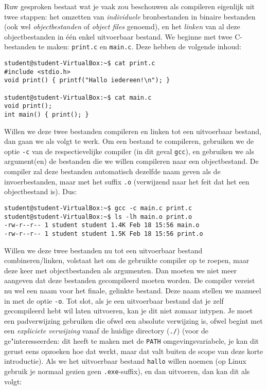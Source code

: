 \documentclass[a4paper,twoside,openany]{memoir}
\begin{document}
Ruw gesproken bestaat wat je vaak zou beschouwen als compileren eigenlijk
uit twee stappen: het omzetten van \emph{individuele} bronbestanden
in binaire bestanden (ook wel \emph{objectbestanden} of \emph{object files}
genoemd), en het \emph{linken} van al deze objectbestanden in één enkel
uitvoerbaar bestand. We beginne met twee C-bestanden te maken: \verb!print.c! en
\verb!main.c!. Deze hebben de volgende inhoud:

\begin{verbatim}
student@student-VirtualBox:~$ cat print.c
#include <stdio.h>
void print() { printf("Hallo iedereen!\n"); }

student@student-VirtualBox:~$ cat main.c
void print();
int main() { print(); }
\end{verbatim}

Willen we deze twee bestanden compileren en linken tot een uitvoerbaar bestand,
dan gaan we als volgt te werk. Om een bestand te compileren, gebruiken we de
optie \verb!-c! van de respectievelijke compiler (in dit geval \verb!gcc!), en
gebruiken we als argument(en) de bestanden die we willen compileren naar een
objectbestand. De compiler zal deze bestanden automatisch dezelfde naam geven
als de invoerbestanden, maar met het suffix \verb!.o! (verwijzend naar het feit
dat het een objectbestand is). Dus:

\begin{verbatim}
student@student-VirtualBox:~$ gcc -c main.c print.c 
student@student-VirtualBox:~$ ls -lh main.o print.o 
-rw-r--r-- 1 student student 1.4K Feb 18 15:56 main.o
-rw-r--r-- 1 student student 1.5K Feb 18 15:56 print.o
\end{verbatim}

Willen we deze twee bestanden nu tot een uitvoerbaar bestand combineren/linken,
volstaat het om de gebruikte compiler op te roepen, maar deze keer met
objectbestanden als argumenten. Dan moeten we niet meer aangeven dat deze
bestanden gecompileerd moeten worden. De compiler vereist nu wel een naam voor
het finale, gelinkte bestand. Deze naam stellen we manueel in met de optie
\verb!-o!. Tot slot, als je een uitvoerbaar bestand dat je zelf gecompileerd
hebt wil laten uitvoeren, kan je dit niet zomaar intypen. Je moet een
padverwijzing gebruiken die ofwel een absolute verwijzing is, ofwel begint met
een \emph{expliciete verwijzing} vanaf de huidige directory (\verb!./!) (voor de
ge"interesseerden: dit heeft te maken met de \verb!PATH! omgevingsvariabele, je
kan dit gerust eens opzoeken hoe dat werkt, maar dat valt buiten de scope van
deze korte introductie). Als we het uitvoerbaar bestand \verb!hallo! willen
noemen (op Linux gebruik je normaal gezien geen \verb!.exe!-suffix), en dan
uitvoeren, dan kan dit als volgt:
\end{document}
